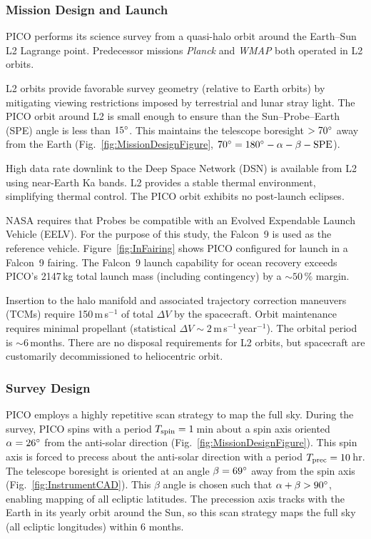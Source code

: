 \subsubsection{Mission Design and Launch}
\label{sec:mission_design} %

PICO performs its science survey from a quasi-halo orbit around the
Earth--Sun L2 Lagrange point. Predecessor missions \textit{Planck} and
\textit{WMAP} both operated in L2 orbits.

L2 orbits provide favorable survey geometry (relative to Earth orbits)
by mitigating viewing restrictions imposed by terrestrial and lunar
stray light. The PICO orbit around L2 is small enough to ensure than
the Sun--Probe--Earth (SPE) angle is less than $15^\circ$. This
maintains the telescope boresight $>70^\circ$ away from the Earth
(Fig.~\ref{fig:MissionDesignFigure},
$70^\circ = 180^\circ -\alpha - \beta - \rm{SPE}$).

%

High data rate downlink to the Deep Space Network (DSN) is available
from L2 using near-Earth Ka bands. L2 provides a stable thermal
environment, simplifying thermal control. The PICO orbit exhibits no
post-launch eclipses.
 
NASA requires that Probes be compatible with an Evolved Expendable
Launch Vehicle (EELV). For the purpose of this study, the Falcon~9
\citep{SpaceX2015} is used as the reference
vehicle. Figure~\ref{fig:InFairing} shows PICO configured for launch
in a Falcon~9 fairing. The Falcon~9 launch capability for ocean
recovery exceeds PICO's 2147\,kg total launch mass (including contingency) by a
$\sim 50\,\%$ margin.

Insertion to the halo manifold and associated trajectory correction
maneuvers (TCMs) require 150\,m\,s$^{-1}$ of total $\Delta V$ by the
spacecraft. Orbit maintenance requires minimal propellant (statistical
$\Delta V\sim 2$\,m\,s$^{-1}$\,year$^{-1}$). The orbital period is $\sim6$\,months.
There are no disposal requirements for L2 orbits, but spacecraft are customarily
decommissioned to heliocentric orbit.


\subsubsection{Survey Design}
\label{sec:survey_design} %
 
PICO employs a highly repetitive scan strategy to map the full
sky. During the survey, PICO spins with a period
$T_{\rm spin} = 1$\,min about a spin axis oriented $\alpha=26^\circ$
from the anti-solar direction (Fig.~\ref{fig:MissionDesignFigure}). This spin axis
is forced to precess about the anti-solar direction with a period
$T_{\rm prec}= 10$\,hr. The telescope boresight is oriented at an
angle $\beta=69^\circ$ away from the spin axis (Fig.~\ref{fig:InstrumentCAD}). This $\beta$ angle is
chosen such that $\alpha + \beta > 90^\circ$, enabling mapping of all
ecliptic latitudes. The precession axis tracks with the Earth in its
yearly orbit around the Sun, so this scan strategy maps the full sky
(all ecliptic longitudes) within 6 months.

